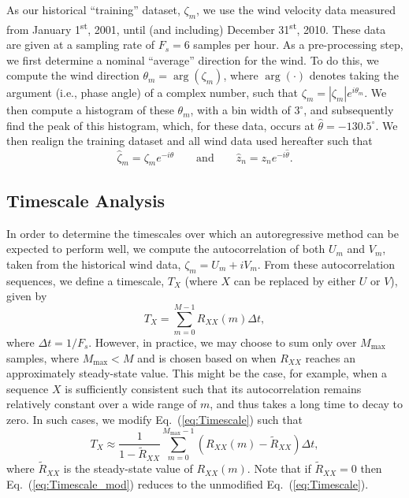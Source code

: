 \documentclass[11pt, oneside]{article}
\newcommand{\eqnref}[1]{Eq.~(\ref{#1})}
\begin{document}
As our historical ``training'' dataset, $\zeta_m$, we use the wind velocity data measured from January 1\textsuperscript{st}, 2001, until (and including) December 31\textsuperscript{st}, 2010.
These data are given at a sampling rate of $F_s = 6$ samples per hour.
As a pre-processing step, we first determine a nominal ``average'' direction for the wind.
To do this, we compute the wind direction $\theta_m = \arg (\zeta_m)$, where $\arg ( \cdot )$ denotes taking the argument (i.e., phase angle) of a complex number, such that $\zeta_m = |\zeta_m| e^{i \theta_m}$.
We then compute a histogram of these $\theta_m$, with a bin width of $3^\circ$, and subsequently find the peak of this histogram, which, for these data, occurs at $\hat{\theta} = -130.5^\circ$.
We then realign the training dataset and all wind data used hereafter such that
\begin{equation}
\hat{\zeta}_m = \zeta_m e^{-i\hat{\theta}}
\quad\quad \text{and} \quad\quad
\hat{z}_n = z_n e^{-i\hat{\theta}}.
\end{equation}

\subsection{Timescale Analysis}\label{sec:Methodology:Timescale}
In order to determine the timescales over which an autoregressive method can be expected to perform well, we compute the autocorrelation of both $U_m$ and $V_m$, taken from the historical wind data, $\zeta_m = U_m + i V_m$.
From these autocorrelation sequences, we define a timescale, $T_X$ (where $X$ can be replaced by either $U$ or $V$), given by
\begin{equation}\label{eq:Timescale}
T_X = \sum_{m = 0}^{M-1} R_{XX}(m) \Delta t,
\end{equation}
where $\Delta t = 1/F_s$.
However, in practice, we may choose to sum only over $M_\text{max}$ samples, where $M_\text{max} < M$ and is chosen based on when $R_{XX}$ reaches an approximately steady-state value.
This might be the case, for example, when a sequence $X$ is sufficiently consistent such that its autocorrelation remains relatively constant over a wide range of $m$, and thus takes a long time to decay to zero.
In such cases, we modify \eqnref{eq:Timescale} such that
\begin{equation}\label{eq:Timescale_mod}
T_X \approx \frac{1}{1 - \tilde{R}_{XX}} \sum_{m = 0}^{M_\text{max}-1} (R_{XX}(m) - \tilde{R}_{XX}) \Delta t,
\end{equation}
where $\tilde{R}_{XX}$ is the steady-state value of $R_{XX}(m)$.
Note that if $\tilde{R}_{XX} = 0$ then \eqnref{eq:Timescale_mod} reduces to the unmodified \eqnref{eq:Timescale}.
\end{document}
